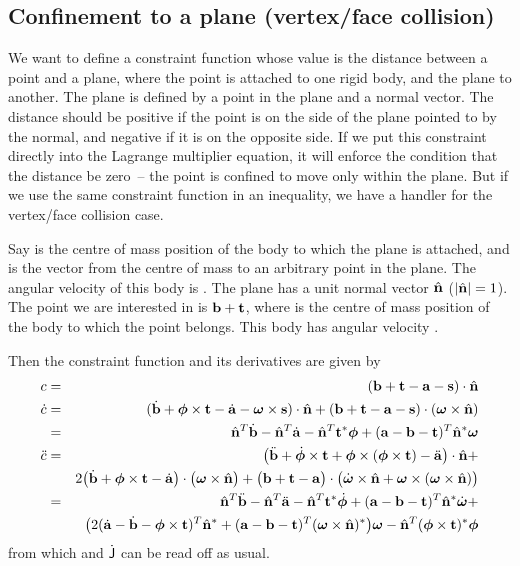 \subsection{Confinement to a plane (vertex/face collision) \label{vertexFaceConstraint}}

We want to define a constraint function whose value is the distance between a point
and a plane, where the point is attached to one rigid body, and the plane to another. The plane
is defined by a point in the plane and a normal vector. The distance should be positive if the
point is on the side of the plane pointed to by the normal, and negative if it is on the opposite
side. If we put this constraint directly into the Lagrange multiplier equation, it will enforce
the condition that the distance be zero~-- the point is confined to move only within the plane.
But if we use the same constraint function in an inequality, we have a handler for the
vertex/face collision case.

Say  is the centre of mass position of the body to which the plane is attached, and 
is the vector from the centre of mass to an arbitrary point in the plane. The angular velocity
of this body is \ve{\omega}. The plane has a unit normal vector $\hat{\ve{n}}$
($\norm{\hat{\ve{n}}} = 1$). The point we are interested in is $\ve{b} + \ve{t}$, where  is
the centre of mass position of the body to which the point belongs. This body has angular
velocity \ve{\phi}.

Then the constraint function and its derivatives are given by
\begin{eqnarray}
c &=& (\ve{b} + \ve{t} - \ve{a} - \ve{s})\cdot\hat{\ve{n}} \\
\dot{c} &=& (\dot{\ve{b}} + \ve{\phi}\times\ve{t} - \dot{\ve{a}} - \ve{\omega}\times\ve{s})
    \cdot\hat{\ve{n}} + (\ve{b} + \ve{t} - \ve{a} - \ve{s})\cdot(\ve{\omega}\times\hat{\ve{n}})
    \nonumber\\
&=& \hat{\ve{n}}^T\dot{\ve{b}} - \hat{\ve{n}}^T\dot{\ve{a}} - \hat{\ve{n}}^T\dual{\ve{t}}\ve{\phi}
    + (\ve{a} - \ve{b} - \ve{t})^T \dual{\hat{\ve{n}}} \ve{\omega} \\
\ddot{c} &=& \big( \ddot{\ve{b}} + \dot{\ve{\phi}}\times\ve{t} +
    \ve{\phi}\times(\ve{\phi}\times\ve{t}) - \ddot{\ve{a}} \big) \cdot \hat{\ve{n}}+\nonumber\\*&&
    2\big(\dot{\ve{b}} + \ve{\phi}\times\ve{t} - \dot{\ve{a}}\big)
    \cdot \big(\ve{\omega}\times\hat{\ve{n}}\big)
    + \big(\ve{b} + \ve{t} - \ve{a}\big) \cdot \big( \dot{\ve{\omega}}\times\hat{\ve{n}} +
    \ve{\omega}\times(\ve{\omega}\times\hat{\ve{n}}) \big) \nonumber\\
&=&  \hat{\ve{n}}^T \ddot{\ve{b}}
    -\hat{\ve{n}}^T \ddot{\ve{a}}
    -\hat{\ve{n}}^T\dual{\ve{t}} \dot{\ve{\phi}}
    +(\ve{a} - \ve{b} - \ve{t})^T \dual{\hat{\ve{n}}} \dot{\ve{\omega}} + \\*&&
    \big( 2(\dot{\ve{a}} - \dot{\ve{b}} - \ve{\phi}\times\ve{t})^T \dual{\hat{\ve{n}}} 
    +(\ve{a} - \ve{b} - \ve{t})^T \dual{(\ve{\omega}\times\hat{\ve{n}})}\big) \ve{\omega}
    -\hat{\ve{n}}^T\dual{(\ve{\phi}\times\ve{t})} \ve{\phi} \nonumber
\end{eqnarray}
from which  and $\dot{\mathsf{J}}$ can be read off as usual.



